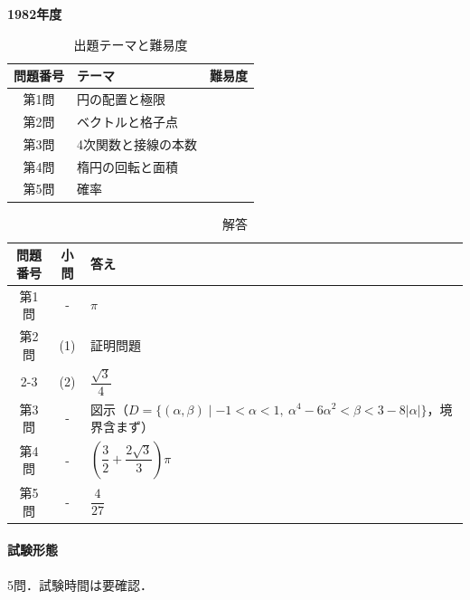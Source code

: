 \documentclass[../../main.tex]{subfiles}
\begin{document}
\begin{center}
  {\fontsize{48pt}{58pt}\selectfont \textbf{1982}\normalsize\textbf{年度}}
\end{center}

\begin{table}[htb]
  \centering
  \caption{出題テーマと難易度}
  \begin{tabular}{|c|p{9cm}|c|}
    \hline
    \textbf{問題番号} & \textbf{テーマ} & \textbf{難易度} \\
    \hline
    第1問 & 円の配置と極限 & \\
    \hline
    第2問 & ベクトルと格子点 & \\
    \hline
    第3問 & 4次関数と接線の本数 & \\
    \hline
    第4問 & 楕円の回転と面積 & \\
    \hline
    第5問 & 確率 & \\
    \hline
  \end{tabular}
\end{table}

\begin{table}[htb]
  \centering
  \caption{解答}
  \renewcommand{\arraystretch}{1.4}
  \begin{tabular}{|c|c|p{9cm}|}
    \hline
    \textbf{問題番号} & \textbf{小問} & \textbf{答え} \\
    \hline
    第1問 & - & $\pi$ \\
    \hline
    第2問 & (1) & 証明問題 \\
    \cline{2-3}
    & (2) & $\dfrac{\sqrt{3}}{4}$ \\
    \hline
    第3問 & - & 図示（$D=\{(\alpha,\beta)\mid -1<\alpha<1,\ \alpha^4-6\alpha^2<\beta<3-8|\alpha|\}$，境界含まず） \\
    \hline
    第4問 & - & $\left(\dfrac{3}{2}+\dfrac{2\sqrt{3}}{3}\right)\pi$ \\
    \hline
    第5問 & - & $\dfrac{4}{27}$ \\
    \hline
  \end{tabular}
\end{table}

\paragraph{試験形態}
5問．試験時間は要確認．
\end{document}
